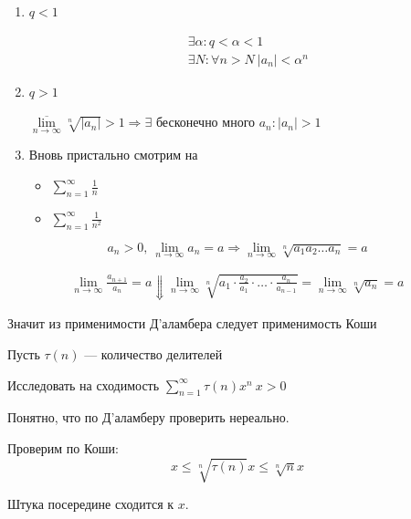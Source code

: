 \begin{enumerate}
    \item
        \( q < 1 \)

        \begin{gather*}
            \exists \alpha : q < \alpha < 1
            \\
            \exists N : \forall n > N \ |a_n| < \alpha^n
        \end{gather*}
    \item
        \( q > 1 \)

        \( \overline{\lim\limits_{n \to \infty}} \sqrt[n]{|a_n|} > 1 \Rightarrow \exists \)
        бесконечно много \( a_n : |a_n| > 1 \)
    \item
        Вновь пристально смотрим на
        \begin{itemize}
            \item
                \( \sum\limits_{n = 1}^{\infty} \frac{1}{n} \)
            \item
                \( \sum\limits_{n = 1}^{\infty} \frac{1}{n^2} \)
        \end{itemize}
\end{enumerate}

\begin{example}{}{}
    \[
        a_n > 0, \ \lim\limits_{n \to \infty} a_n = a \Rightarrow \lim\limits_{n \to \infty} \sqrt[n]{a_1 a_2 \ldots a_n} = a
    \]

    \begin{gather*}
        \lim\limits_{n \to \infty} \frac{a_{n + 1}}{a_n} = a
        \Downarrow
        \lim\limits_{n \to \infty} \sqrt[n]{a_1 \cdot \frac{a_2}{a_1} \cdot \ldots \cdot \frac{a_n}{a_{n - 1}}}
            = \lim\limits_{n \to \infty} \sqrt[n]{a_n} = a
    \end{gather*}
\end{example}

Значит из применимости Д'аламбера следует применимость Коши

\begin{example}{}{}
    Пусть \( \tau(n) \) --- количество делителей

    Исследовать на сходимость \( \sum\limits_{n = 1}^{\infty} \tau(n) x^n \ x > 0 \)
\end{example}

Понятно, что по Д'аламберу проверить нереально. 

Проверим по Коши:
\[
    x \leq \sqrt[n]{\tau(n)} x \leq \sqrt[n]{n} x
\]

Штука посередине сходится к \( x \).

